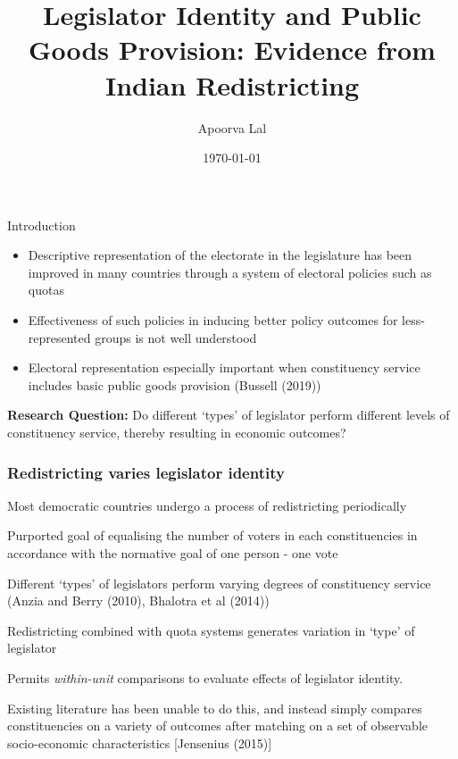 \documentclass[12pt, aspectratio=169]{beamer}
\begin{document}
\title{Legislator Identity and Public Goods Provision: Evidence from
Indian Redistricting}
\author{Apoorva Lal}

\date{\today}

\frame{\titlepage}



\begin{frame}{Introduction}

\begin{itemize}

\item Descriptive representation of the electorate in the legislature
  has been improved in many countries through a system of electoral
  policies such as quotas
\item Effectiveness of such policies in inducing better policy
  outcomes for less-represented groups is not well understood
\item Electoral representation especially important when constituency
  service includes basic public goods provision (Bussell (2019))
\end{itemize}

\textbf{Research Question:} Do different `types' of legislator perform
  different levels of constituency service, thereby resulting in
  economic outcomes?

\end{frame}

\begin{frame}[t]\frametitle{Redistricting varies legislator identity}

\bi
  \item Most democratic countries undergo a process of redistricting
  periodically
  \item Purported goal of equalising the number of voters in each
  constituencies in accordance with the normative goal of one person
  - one vote
  \item Different `types' of legislators perform varying degrees of
  constituency service (Anzia and Berry (2010), Bhalotra et al (2014))
  \item Redistricting combined with quota systems generates variation
  in `type' of legislator
  \item Permits \emph{within-unit} comparisons to evaluate effects of
  legislator identity.
  \item Existing literature has been unable to do this, and instead
  simply compares constituencies on a variety of outcomes after
  matching on a set of observable socio-economic characteristics
  [Jensenius (2015)]
\ei

\end{frame}
\end{document}
